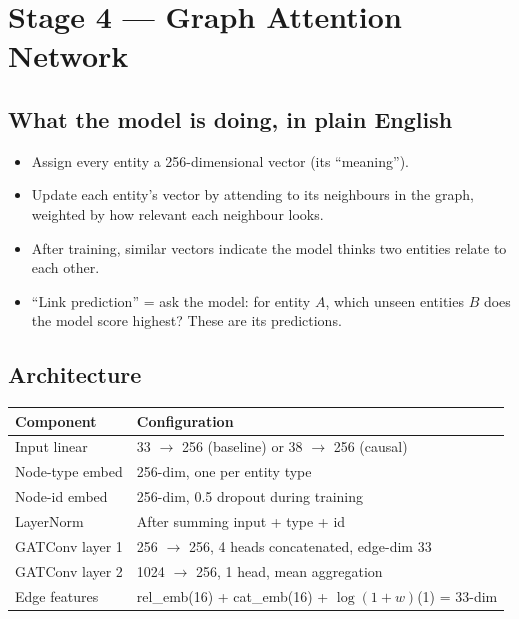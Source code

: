 \documentclass[11pt]{article}
\begin{document}
\section{Stage 4 --- Graph Attention Network}
\label{sec:gat}

\subsection{What the model is doing, in plain English}
\begin{itemize}
  \item Assign every entity a 256-dimensional vector (its ``meaning'').
  \item Update each entity's vector by attending to its neighbours in the graph, weighted by how relevant each neighbour looks.
  \item After training, similar vectors indicate the model thinks two entities relate to each other.
  \item ``Link prediction'' = ask the model: for entity \(A\), which unseen entities \(B\) does the model score highest? These are its predictions.
\end{itemize}

\subsection{Architecture}
\begin{center}
\begin{tabular}{ll}
\toprule
\textbf{Component} & \textbf{Configuration} \\
\midrule
Input linear       & 33 \(\to\) 256 (baseline) or 38 \(\to\) 256 (causal) \\
Node-type embed    & 256-dim, one per entity type \\
Node-id embed      & 256-dim, 0.5 dropout during training \\
LayerNorm          & After summing input + type + id \\
GATConv layer 1    & 256 \(\to\) 256, 4 heads concatenated, edge-dim 33 \\
GATConv layer 2    & 1024 \(\to\) 256, 1 head, mean aggregation \\
Edge features      & rel\_emb(16) + cat\_emb(16) + \(\log(1+w)\)(1) = 33-dim \\
\bottomrule
\end{tabular}
\end{center}
\end{document}
